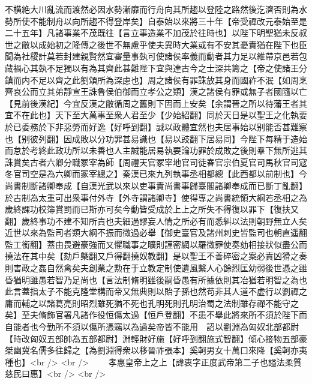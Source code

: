 不横絶大川亂流而渡然必因水勢漸靡而行舟向其所趨以登陸之路然後汔濟否則為水勢所使不能制舟以向所趨不得登岸矣】自泰始以來將三十年【帝受禪改元泰始至是二十五年】凡諸事業不茂既往【言立事造業不加茂於往時也】以陛下明聖猶未反叔世之敝以成始初之隆傳之後世不無慮乎使夫異時大業或有不安其憂責猶在陛下也臣聞為社稷計莫若封建親賢然宜審量事埶可使諸侯率義而動者其力足以維帶京邑若包藏禍心其埶不足獨以有為其齊此甚難陛下宜與達古今之士深共籌之【帝之使諸王分鎮而内不足以齊之此劉頌所為深慮也】周之諸侯有罪誅放其身而國祚不泯【如周烹齊哀公而立其弟靜宣王誅魯侯伯御而立孝公之類】漢之諸侯有罪或無子者國隨以亡【見前後漢紀】今宜反漢之敝循周之舊則下固而上安矣【余謂晉之所以待藩王者其宜不在此也】天下至大萬事至衆人君至少【少始紹翻】同於天日是以聖王之化執要於已委務於下非惡勞而好逸【好呼到翻】誠以政體宜然也夫居事始以别能否甚難察也【别彼列翻】因成敗以分功罪甚易識也【易以豉翻下居易同】今陛下每精于造始而怠於考終此政功所以未善也人主誠能居易執要論功罪於成敗之後則羣下無所逃其誅賞矣古者六卿分職冢宰為師【周禮天官冢宰地官司徒春官宗伯夏官司馬秋官司寇冬官司空是為六卿而冢宰總之】秦漢已來九列執事丞相都總【此西都以前制也】今尚書制斷諸卿奉成【自漢光武以來以吏事責尚書事歸臺閣諸卿奉成而已斷丁亂翻】於古制為太重可出衆事付外寺【外寺謂諸卿寺】使得專之尚書統領大綱若丞相之為歲終課功校簿賞罰而已斯亦可矣今動皆受成於上上之所失不得復以罪下【復扶又翻】歲終事功不建不知所責也夫細過謬妄人情之所必有而悉糾以法則朝野無立人矣近世以來為監司者類大綱不振而微過必舉【御史臺官及諸州刺史皆監司也朝直遥翻監工銜翻】蓋由畏避豪強而又懼職事之曠則謹密網以羅微罪使奏劾相接狀似盡公而撓法在其中矣【劾戶槩翻又戶得翻撓奴教翻】是以聖王不善碎密之案必責凶猾之奏則害政之姦自然禽矣夫創業之勲在于立教定制使遺風繫人心餘烈匡幼弱後世憑之雖昏猶明雖愚若智乃足尚也【言法制脩明雖後嗣昏愚有所據依則其冶猶若明智之為也此言蓋指太子不能克隆堂構而帝又無典則以貽子孫也然苟非其人道不虚行以劉禪之庸而輔之以諸葛亮則昭烈雖死猶不死也孔明死則孔明治蜀之法制雖存禪不能守之矣】至夫脩飾官署凡諸作役恒傷太過【恒戶登翻】不患不舉此將來所不須於陛下而自能者也今勤所不須以傷所憑竊以為過矣帝皆不能用　詔以劉淵為匈奴北部都尉【時改匈奴五部帥為五部都尉】淵輕財好施【好呼到翻施式智翻】傾心接物五部豪桀幽冀名儒多往歸之【為劉淵得衆以移晉祚張本】奚軻男女十萬口來降【奚軻亦夷種也】<br />
<br />
　　孝惠皇帝上之上【諱衷字正度武帝第二子也謚法柔質慈民曰惠】<br />
<br />
